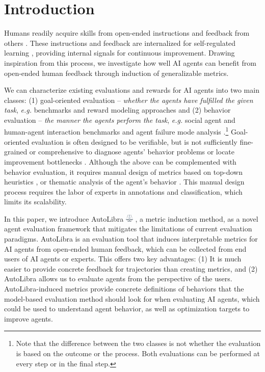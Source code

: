 \section{Introduction}

Humans readily acquire skills from open-ended instructions and feedback from others
\citep{tomasello1993cultural}. These instructions and feedback are internalized for
self-regulated learning \citep{pintrich2002development,nicol2006formative}, providing
internal signals for continuous improvement. Drawing inspiration from this
process, we investigate how well AI agents can benefit from open-ended human feedback
through induction of generalizable metrics.

We can characterize existing evaluations and rewards for AI agents into two main
classes: (1) goal-oriented evaluation -- \emph{whether the agents have fulfilled
the given task}, \emph{e.g.} benchmarks \citep{zhouwebarena,jimenezswe,chan2024mle,paglieri2024balrog}
and reward modeling approaches \citep{pan2024autonomous,chen2025scaling,choudhury2025process}
and (2) behavior evaluation -- \emph{the manner the agents perform the task}, \emph{e.g.}
social agent and human-agent interaction benchmarks \citep{zhousotopia,shao2024collaborative}
and agent failure mode analysis \citep{pan2025why,zhang2023effects,yang2023behavioral}.\footnote{Note
that the difference between the two classes is not whether the evaluation is
based on the outcome or the process. Both evaluations can be performed at every step
or in the final step.} Goal-oriented evaluation is often designed to be
verifiable, but is not sufficiently fine-grained or comprehensive to diagnose agents'
behavior problems or locate improvement bottlenecks \citep{yehudai2025survey}.
Although the above can be complemented with behavior evaluation, it requires manual
design of metrics based on top-down heuristics \citep{zhousotopia}, or thematic analysis
of the agent's behavior \citep{shao2024collaborative,pan2025why}. This manual design
process requires the labor of experts in annotations and classification, which
limits its scalability.

In this paper, we introduce AutoLibra \protect
\includegraphics[height=1em]{figs/scale.png}
, a metric induction method, as a novel agent evaluation framework that
mitigates the limitations of current evaluation paradigms. AutoLibra is an evaluation
tool that induces interpretable metrics for AI agents from open-ended human feedback,
which can be collected from end users of AI agents or experts. This offers two key
advantages: (1) It is much easier to provide concrete feedback for trajectories
than creating metrics, and (2) AutoLibra allows us to evaluate agents from the perspective
of the users. AutoLibra-induced metrics provide concrete definitions of
behaviors that the model-based evaluation method should look for when evaluating
AI agents, which could be used to understand agent behavior, as well as
optimization targets to improve agents.

